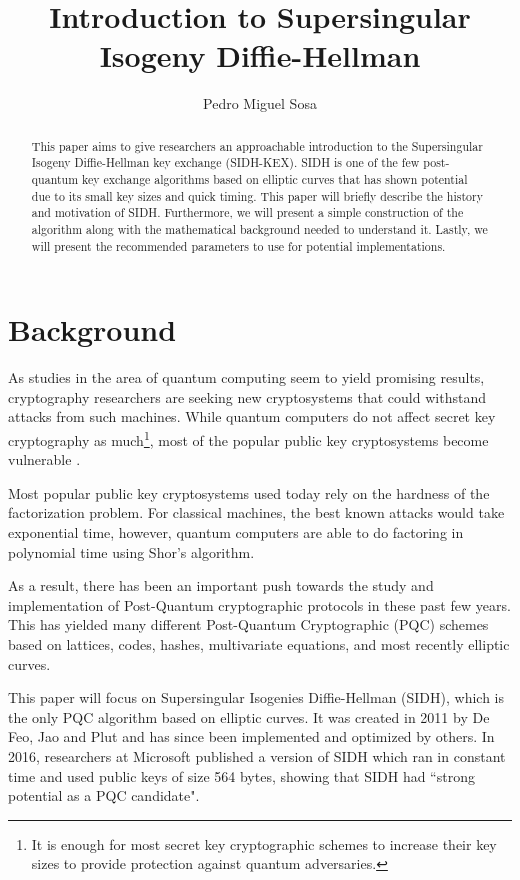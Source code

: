 \documentclass[10pt,twocolumn]{article} %
\title{Introduction to Supersingular Isogeny Diffie-Hellman}
\author{Pedro Miguel Sosa}
\begin{document}
\maketitle

\begin{abstract}
This paper aims to give researchers an approachable introduction to the Supersingular Isogeny Diffie-Hellman key exchange (SIDH-KEX). SIDH is one of the few post-quantum key exchange algorithms based on elliptic curves that has shown potential due to its small key sizes and quick timing. This paper will briefly describe the history and motivation of SIDH. Furthermore, we will present a simple construction of the algorithm along with the mathematical background needed to understand it. Lastly, we will present the recommended parameters to use for potential implementations.
\end{abstract}

\section{Background}
As studies in the area of quantum computing seem to yield promising results, cryptography researchers are seeking new cryptosystems that could withstand attacks from such machines. While quantum computers do not affect secret key cryptography as much\footnote{It is enough for most secret key cryptographic schemes to increase their key sizes to provide protection against quantum adversaries.}, most of the popular public key cryptosystems become vulnerable \cite{bernstein2009introduction}. 
\par Most popular public key cryptosystems used today rely on the hardness of the factorization problem. For classical machines, the best known attacks would take exponential time, however, quantum computers are able to do factoring in polynomial time using Shor's algorithm.
\par As a result, there has been an important push towards the study and implementation of Post-Quantum cryptographic protocols in these past few years. This has yielded many different Post-Quantum Cryptographic (PQC) schemes based on lattices, codes, hashes, multivariate equations, and most recently elliptic curves.
\par This paper will focus on Supersingular Isogenies Diffie-Hellman (SIDH), which is the only PQC algorithm based on elliptic curves. It was created in 2011 by De Feo, Jao and Plut \cite{Jao2011} and has since been implemented and optimized by others. In 2016, researchers at Microsoft published a version of SIDH which ran in constant time and used public keys of size 564 bytes, showing that SIDH had ``strong potential as a PQC candidate"\cite{costello2016}.
\end{document}
